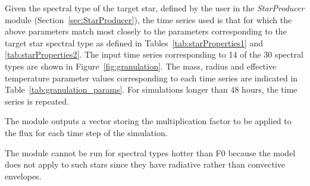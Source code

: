 \documentclass[11pt]{article}      %
\begin{document}
Given the spectral type of the target star, defined by the user in the {\it StarProducer} module (Section~\ref{sec:StarProducer}), the time series used is that for which the above parameters match most closely to the parameters corresponding to the target star spectral type as defined in Tables~\ref{tab:starProperties1} and \ref{tab:starProperties2}. The input time series corresponding to 14 of the 30 spectral types are shown in Figure~\ref{fig:granulation}. The mass, radius and effective temperature parameter values corresponding to each time series are indicated in Table~\ref{tab:granulation_params}. For simulations longer than 48 hours, the time series is repeated.

The module outputs a vector storing the multiplication factor to be applied to the flux for each time step of the simulation.

The module cannot be run for spectral types hotter than F0 because the model does not apply to such stars since they have radiative rather than convective envelopes.
\end{document}
